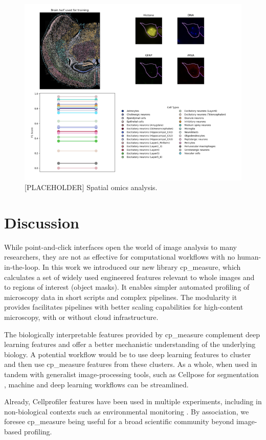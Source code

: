 \documentclass{article}
\begin{document}
\begin{figure}[htbp]
\centering
\includegraphics[width=.9\linewidth]{./figs/spatial.png}
\caption{\label{fig:spatial_omics}{[}PLACEHOLDER] Spatial omics analysis.}
\end{figure}
\section{Discussion}
\label{sec:orgf37b369}
While point-and-click interfaces open the world of image analysis to many researchers, they are not as effective for computational workflows with no human-in-the-loop. In this work we introduced our new library cp\_measure, which calculates a set of widely used engineered features relevant to whole images and to regions of interest (object masks). It enables simpler automated profiling of microscopy data in short scripts and complex pipelines. The modularity it provides facilitates pipelines with better scaling capabilities for high-content microscopy, with or without cloud infrastructure.

The biologically interpretable features provided by cp\_measure complement deep learning features and offer a better mechanistic understanding of the underlying biology. A potential workflow would be to use deep learning features to cluster and then use cp\_measure features from these clusters. As a whole, when used in tandem with generalist image-processing tools, such as Cellpose for segmentation \cite{stringerCellposeGeneralistAlgorithm2021}, machine and deep learning workflows can be streamlined. 

Already, Cellprofiler features have been used in multiple experiments, including in non-biological contexts such as environmental monitoring \citep{ideharaExploringNileRed2025}. By association, we foresee cp\_measure being useful for a broad scientific community beyond image-based profiling.
\end{document}
